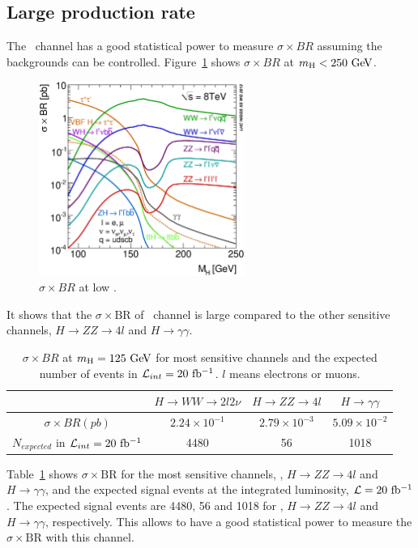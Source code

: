 %
\subsection{Large production rate}

The \hww\ channel has a good statistical power to measure $\sigma \times BR$
assuming the backgrounds can be controlled.
Figure~\ref{fig:XSBR_8TeV_SM_LM} shows $\sigma \times BR$ at $m_{\mathrm{H}}<250~\mathrm{Ge\kern -0.1em V}$.
\begin{figure}[t]
\centering
\includegraphics[width=0.6\textwidth]{figures/XSBR_8TeV_SM_LM.eps}
\caption{$\sigma \times BR$ at low \mHi.}
\label{fig:XSBR_8TeV_SM_LM}
\end{figure}
It shows that the $\sigma \times \textrm{BR}$ of \hww\ channel 
is large compared to the other sensitive channels, $H \rightarrow ZZ\rightarrow 4l$
and $H \rightarrow\gamma\gamma$. 
\begin{table}[htb]
\centering
\begin{tabular}{c | c c c}
\hline 
        & $H \rightarrow WW \rightarrow 2l2\nu$   & $H \rightarrow ZZ\rightarrow 4l$ 
        & $H \rightarrow\gamma\gamma$  \\
\hline \hline 
$\sigma \times BR (pb)$  
        & $2.24\times10^{-1}$ &  $2.79\times10^{-3}$ & $5.09\times10^{-2}$ \\ 
$N_{expected}$ in $\mathcal{L}_{int} = 20~\mathrm{fb^{-1}}$ 
        & 4480 &  56 & 1018 \\ 
\hline 
\end{tabular}
\label{tab:XSBR_8TeV_SM_125}
\caption{$\sigma \times BR$ at $m_{\mathrm{H}}=125~\mathrm{Ge\kern -0.1em V}$ for most sensitive channels 
and the expected number of events in $\mathcal{L}_{int} = 20~\mathrm{fb^{-1}}$.
$l$ means electrons or muons.}
\end{table}
Table~\ref{tab:XSBR_8TeV_SM_125} shows $\sigma \times \textrm{BR}$ for 
the most sensitive channels, \hww, $H \rightarrow ZZ\rightarrow 4l$
and $H \rightarrow\gamma\gamma$, and the expected signal events at
the integrated luminosity, $\mathcal{L}=20~\mathrm{fb^{-1}}$. The expected signal 
events are 4480, 56 and 1018 for \hww, $H \rightarrow ZZ\rightarrow 4l$
and $H \rightarrow\gamma\gamma$, respectively. This allows to have a 
good statistical power to measure the $\sigma \times \textrm{BR}$
with this channel. 

